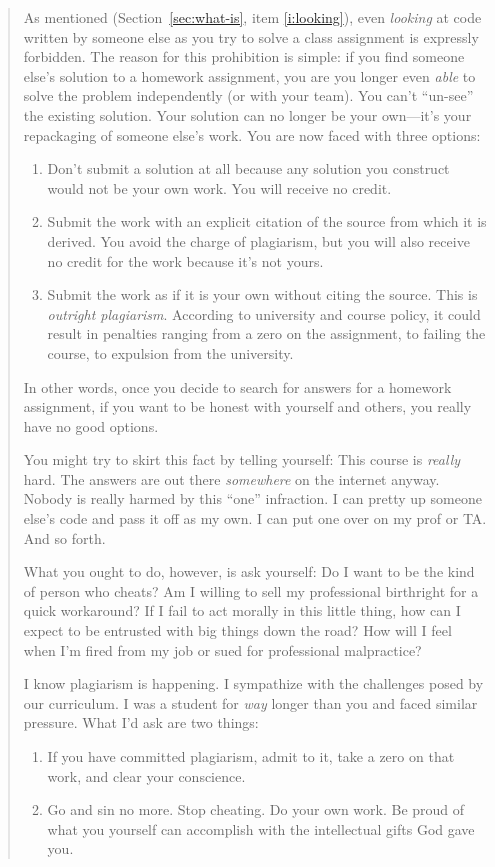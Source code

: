 \begin{quotation}
  As mentioned (Section~\ref{sec:what-is}, item \ref{i:looking}),
  even \emph{looking} at code written by someone else
  as you try to solve a class assignment is expressly forbidden.
  The reason for this prohibition is simple:
  if you find someone else's solution to a homework assignment,
  you are you longer even \emph{able} to solve the problem independently
  (or with your team).
  You can't ``un-see'' the existing solution.
  Your solution can no longer be your own---it's your repackaging of someone else's work.
  You are now faced with three options:
  \begin{enumerate}
  \item
    Don't submit a solution at all
    because any solution you construct
    would not be your own work.
    You will receive no credit.
  \item
    Submit the work with an explicit citation
    of the source from which it is derived.
    You avoid the charge of plagiarism,
    but you will also receive no credit for the work
    because it's not yours.  
  \item
    Submit the work as if it is your own
    without citing the source.
    This is \emph{outright plagiarism}.
    According to university and course policy,
    it could result in penalties ranging from
    a zero on the assignment,
    to failing the course,
    to expulsion from the university.
  \end{enumerate}
  In other words,
  once you decide to search for answers for a homework assignment,
  if you want to be honest with yourself and others,
  you really have no good options.

  You might try to skirt this fact by telling yourself:
  This course is \emph{really} hard.
  The answers are out there \emph{somewhere} on the internet anyway.
  Nobody is really harmed by this ``one'' infraction.
  I can pretty up someone else's code and pass it off as my own.
  I can put one over on my prof or TA.
  And so forth.

  What you ought to do, however, is ask yourself:
  Do I want to be the kind of person who cheats?
  Am I willing to sell my professional birthright for a quick workaround?
  If I fail to act morally in this little thing,
  how can I expect to be entrusted with big things down the road?
  How will I feel when I'm fired from my job or sued for professional malpractice?

  I know plagiarism is happening.
  I sympathize with the challenges posed by our curriculum.
  I was a student for \emph{way} longer than you
  and faced similar pressure.
  What I'd ask are two things:
  \begin{enumerate}
  \item
    If you have committed plagiarism,
    admit to it,
    take a zero on that work,
    and clear your conscience.
  \item
    Go and sin no more.
    Stop cheating.
    Do your own work.
    Be proud of what you yourself can accomplish
    with the intellectual gifts God gave you.
  \end{enumerate}
\end{quotation}



